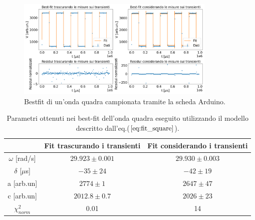 \documentclass{article}
\begin{document}
            \begin{figure}[H]
                \centering
                \includegraphics[width=0.85\textwidth]{bestfit_squarewave.png} %
                \caption{Bestfit di un'onda quadra campionata tramite la scheda Arduino.}
                \label{fig:bestfit_square}
            \end{figure}     
            

            \begin{table}[H]
                \centering
                \begin{tabular}{ccc}
                    \hline
                     & Fit trascurando i transienti & Fit considerando i transienti \\
                    \hline
                    $\omega$ [rad/s]        & $29.923 \pm 0.001$    & $29.930\pm 0.003$ \\
                    $\delta$ [$\mu$s]       & $-35\pm 24$           & $-42\pm 19$ \\
                    a [arb.un]              & $2774 \pm 1$          & $2647 \pm 47$ \\
                    c [arb.un]              & $2012.8 \pm 0.7$      & $2026 \pm 23$ \\
                    $\chi^{2}_{norm}$ & 0.01 & 14 \\
                    \hline
                \end{tabular}
                \caption{Parametri ottenuti nei best-fit dell'onda quadra eseguito utilizzando il modello descritto dall'eq.($\ref{eq:fit_square}$).}
                \label{tab:bestfit_square}
            \end{table}
            

            
\end{document}
